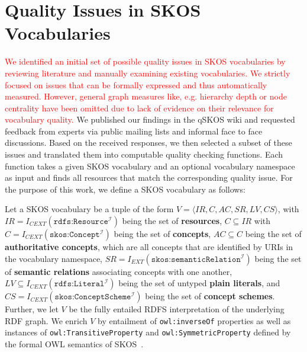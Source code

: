 
\section{Quality Issues in SKOS Vocabularies}\label{sec:criteria}


\textcolor{red}{
We identified an initial set of possible quality issues in SKOS vocabularies by reviewing literature and manually examining existing vocabularies. We strictly focused on issues that can be formally expressed and thus automatically measured. However, general graph measures like, e.g. hierarchy depth or node centrality have been omitted due to lack of evidence on their relevance for vocabulary quality.}
We published our findings in the qSKOS wiki and requested feedback from experts via public mailing lists and informal face to face discussions. Based on the received responses, we then selected a subset of these issues and translated them into computable quality checking functions. Each function takes a given SKOS vocabulary and an optional vocabulary namespace as input and finds all resources that match the corresponding quality issue. For the purpose of this work, we define a SKOS vocabulary as follows:

\begin{mydef}
Let a SKOS vocabulary be a tuple of the form $V = \langle IR, C, AC, SR, LV, CS \rangle$, with \(IR = I_{CEXT}(\texttt{rdfs:Resource}^\mathcal{I})\) being the set of \textbf{resources}, \(C \subseteq IR\) with \(C = I_{CEXT}(\texttt{skos:Concept}^\mathcal{I})\) being the set of \textbf{concepts}, \(AC \subseteq C\) being the set of \textbf{authoritative concepts}, which are all concepts that are identified by URIs in the vocabulary namespace, \(SR = I_{EXT}(\texttt{skos:semanticRelation}^\mathcal{I})\) being the set of \textbf{semantic relations} associating concepts with one another, $LV \subseteq I_{CEXT}(\texttt{rdfs:Literal}^\mathcal{I})$ being the set of untyped \textbf{plain literals}, and \(CS = I_{CEXT}(\texttt{skos:ConceptScheme}^\mathcal{I})\) being the set of \textbf{concept schemes}. Further, we let $V$ be the fully entailed RDFS interpretation of the underlying RDF graph. We enrich $V$ by entailment of \texttt{owl:inverseOf} properties as well as instances of \texttt{owl:TransitiveProperty} and \texttt{owl:SymmetricProperty} defined by the formal OWL semantics of SKOS~\cite{SkosReference2008}.
\end{mydef}

